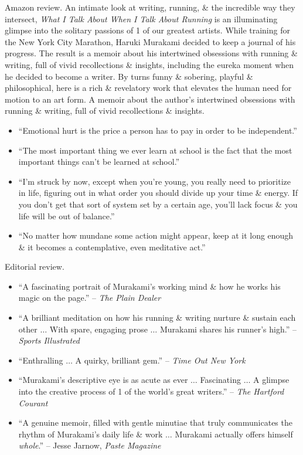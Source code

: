 \documentclass{article}
\begin{document}
\begin{enumerate}
	{\sf Amazon review.} An intimate look at writing, running, \& the incredible way they intersect, {\it What I Talk About When I Talk About Running} is an illuminating glimpse into the solitary passions of 1 of our greatest artists. While training for the New York City Marathon, {\sc Haruki Murakami} decided to keep a journal of his progress. The result is a memoir about his intertwined obsessions with running \& writing, full of vivid recollections \& insights, including the eureka moment when he decided to become a writer. By turns funny \& sobering, playful \& philosophical, here is a rich \& revelatory work that elevates the human need for motion to an art form. A memoir about the author's intertwined obsessions with running \& writing, full of vivid recollections \& insights.
	\begin{itemize}
		\item ``Emotional hurt is the price a person has to pay in order to be independent.''
		\item ``The most important thing we ever learn at school is the fact that the most important things can't be learned at school.''
		\item ``I'm struck by now, except when you're young, you really need to prioritize in life, figuring out in what order you should divide up your time \& energy. If you don't get that sort of system set by a certain age, you'll lack focus \& you life will be out of balance.''
		\item ``No matter how mundane some action might appear, keep at it long enough \& it becomes a contemplative, even meditative act.''
	\end{itemize}
	{\sf Editorial review.}
	\begin{itemize}
		\item ``A fascinating portrait of {\sc Murakami}'s working mind \& how he works his magic on the page.'' -- {\it The Plain Dealer}
		\item ``A brilliant meditation on how his running \& writing nurture \& sustain each other $\ldots$ With spare, engaging prose $\ldots$ {\sc Murakami} shares his runner's high.'' -- {\it Sports Illustrated}
		\item ``Enthralling $\ldots$ A quirky, brilliant gem.'' -- {\it Time Out New York}
		\item ``{\sc Murakami}'s descriptive eye is as acute as ever $\ldots$ Fascinating $\ldots$ A glimpse into the creative process of 1 of the world's great writers.'' -- {\it The Hartford Courant}
		\item ``A genuine memoir, filled with gentle minutiae that truly communicates the rhythm of {\sc Murakami}'s daily life \& work $\ldots$ {\sc Murakami} actually offers himself {\it whole}.'' -- {\sc Jesse Jarnow}, {\it Paste Magazine}

\end{itemize}
\end{enumerate}
\end{document}
